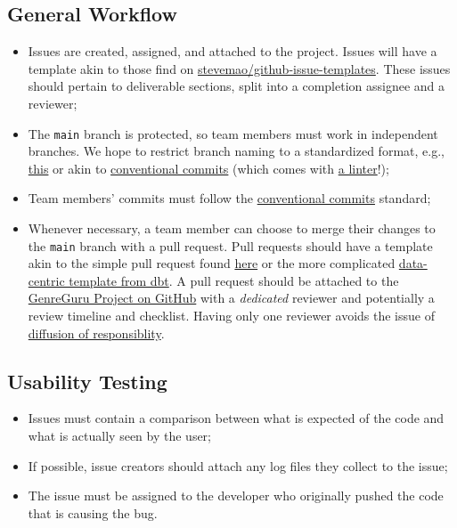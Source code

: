 \documentclass{article}
\begin{document}
\subsection{General Workflow}
\begin{itemize}
  \item Issues are created, assigned, and attached to the project. Issues will have a template akin to those find on \href{https://github.com/stevemao/github-issue-templates/tree/master/system/ISSUE_TEMPLATE}{stevemao/github-issue-templates}. These issues should pertain to deliverable sections, split into a completion assignee and a reviewer;
  \item The \texttt{main} branch is protected, so team members must work in independent branches. We hope to restrict branch naming to a standardized format, e.g., \href{https://dev.to/varbsan/a-simplified-convention-for-naming-branches-and-commits-in-git-il4}{this} or akin to \href{https://www.conventionalcommits.org/en/v1.0.0/}{conventional commits} (which comes with \href{https://github.com/conventional-changelog/commitlint/tree/master/%40commitlint/config-conventional}{a linter}!);
  \item Team members' commits must follow the \href{https://www.conventionalcommits.org/en/v1.0.0/}{conventional commits} standard;
  \item Whenever necessary, a team member can choose to merge their changes to the \texttt{main} branch with a pull request. Pull requests should have a template akin to the simple pull request found \href{https://graphite.dev/guides/pull-request-templates}{here} or the more complicated \href{https://github.com/dbt-labs/dbt-init/blob/master/starter-project/.github/pull_request_template.md}{data-centric template from dbt}. A pull request should be attached to the \href{https://github.com/users/AhmedAl-Hayali/projects/1}{GenreGuru Project on GitHub} with a \emph{dedicated} reviewer and potentially a review timeline and checklist. Having only one reviewer avoids the issue of \href{https://en.wikipedia.org/wiki/Diffusion_of_responsibility}{diffusion of responsiblity}.
\end{itemize}

\subsection{Usability Testing}
\begin{itemize}
  \item Issues must contain a comparison between what is expected of the code and what is actually seen by the user;
  \item If possible, issue creators should attach any log files they collect to the issue;
  \item The issue must be assigned to the developer who originally pushed the code that is causing the bug.
\end{itemize}
\end{document}
